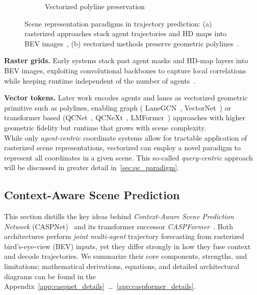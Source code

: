 \begin{figure}[H]
\begin{subfigure}[t]{0.37\textwidth}
    \caption{Vectorized polyline preservation}
    \label{fig:vectorized}
\end{subfigure}
\caption{Scene representation paradigms in trajectory prediction: (a) rasterized approaches stack agent trajectories and HD maps into BEV images~\cite{caspnetSchäfer2022}, (b) vectorized methods preserve geometric polylines~\cite{gao2020vectornet}.}
\label{fig:scene_representations}
\end{figure}

\textbf{Raster grids.} Early systems stack past agent masks and HD-map layers into BEV images, exploiting convolutional backbones to capture local correlations while keeping runtime independent of the number of agents~\cite{cui2019multimodal,chai2019multipath}.

\textbf{Vector tokens.} Later work encodes agents and lanes as vectorized geometric primitive such as polylines, enabling graph ( LaneGCN~\cite{liang2020learning}, VectorNet~\cite{gao2020vectornet}) or transformer based (QCNet~\cite{qcnetZhou2023}, QCNeXt~\cite{qcnextZhou2023}, LMFormer~\cite{lmformerYadav2025}) approaches with higher geometric fidelity but runtime that grows with scene complexity.\\
While only \emph{agent-centric} coordinate systems allow for tractable application of rasterized scene representations, vectorized can employ a novel paradigm to represent all coordinates in a given scene. This so-called \emph{query-centric} approach will be discussed in greater detail in~\autoref{sec:qc_paradigm}.


\subsection{Context-Aware Scene Prediction}
\label{ssec:caspnet}

This section distills the key ideas behind \emph{Context-Aware Scene Prediction Network} (CASPNet)~\cite{caspnetSchäfer2022} and its transformer successor \emph{CASPFormer}~\cite{caspformerYadav2024}. Both architectures perform \emph{joint multi-agent} trajectory forecasting from rasterized bird's-eye-view (BEV) inputs, yet they differ strongly in how they fuse context and decode trajectories. We summarize their core components, strengths, and limitations; mathematical derivations, equations, and detailed architectural diagrams can be found in the Appendix~\ref{app:caspnet_details}~\dots~\ref{app:caspformer_details}.

